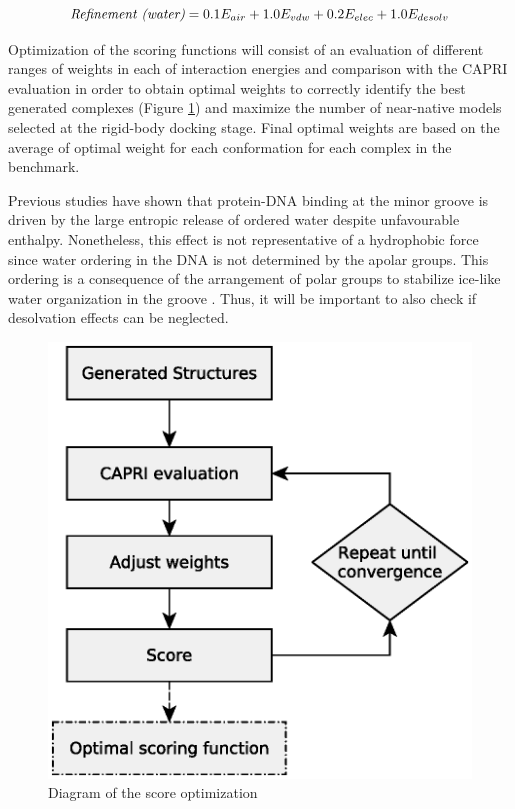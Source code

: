 \documentclass[
	12pt,				%
	openright,			%
	twoside,			%
	a4paper,			%
	english,			%
	french,				%
	spanish,			%
	brazil,				%
	]{abntex2}
\begin{document}
\begin{equation}
\emph{Refinement (water)} = 0.1 E_{air} + 1.0 E_{vdw} + 0.2 E_{elec} + 1.0 E_{desolv}
\label{eq:07}
\end{equation}

Optimization of the scoring functions will consist of an evaluation of different ranges of weights in each of interaction energies and comparison with the CAPRI evaluation in order to obtain optimal weights to correctly identify the best generated complexes (Figure \ref{fig:optimization}) and maximize the number of near-native models selected at the rigid-body docking stage. Final optimal weights are based on the average of optimal weight for each conformation for each complex in the benchmark.

Previous studies have shown that protein-DNA binding at the minor groove is driven by the large entropic release of ordered water despite unfavourable enthalpy. Nonetheless, this effect is not representative of a hydrophobic force since water ordering in the DNA is not determined by the apolar groups. This ordering is a consequence of the arrangement of polar groups to stabilize ice-like water organization in the groove \cite{Privalov2007}. Thus, it will be important to also check if desolvation effects can be neglected.

\begin{figure}
	\centering
	\includegraphics[width=0.7\linewidth]{figures/optimization}
	\caption{Diagram of the score optimization}
	\label{fig:optimization}
\end{figure}


\end{document}
